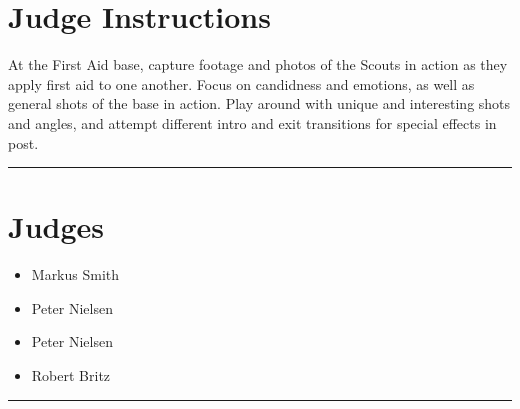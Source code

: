 \documentclass[10pt]{article}
\begin{document}
		\section*{Judge Instructions}
		At the First Aid base, capture footage and photos of the Scouts in action as they apply first aid to one another. Focus on candidness and emotions, as well as general shots of the base in action. Play around with unique and interesting shots and angles, and attempt different intro and exit transitions for special effects in post.
\vspace{0.5cm}
	\hrule
	\vspace{0.5cm}
		\section*{\faUsers \: Judges}

		

	\begin{multicols}{2}

		\begin{itemize}
									\item Markus Smith
									\item Peter Nielsen
						\end{itemize}

		\vfill\null
		\columnbreak

		\begin{itemize}
									\item Peter Nielsen
									\item Robert Britz
						\end{itemize}

		\vfill\null

		\end{multicols}



			\vspace{0.5cm}
	\hrule
	\vspace{0.5cm}
\end{document}
